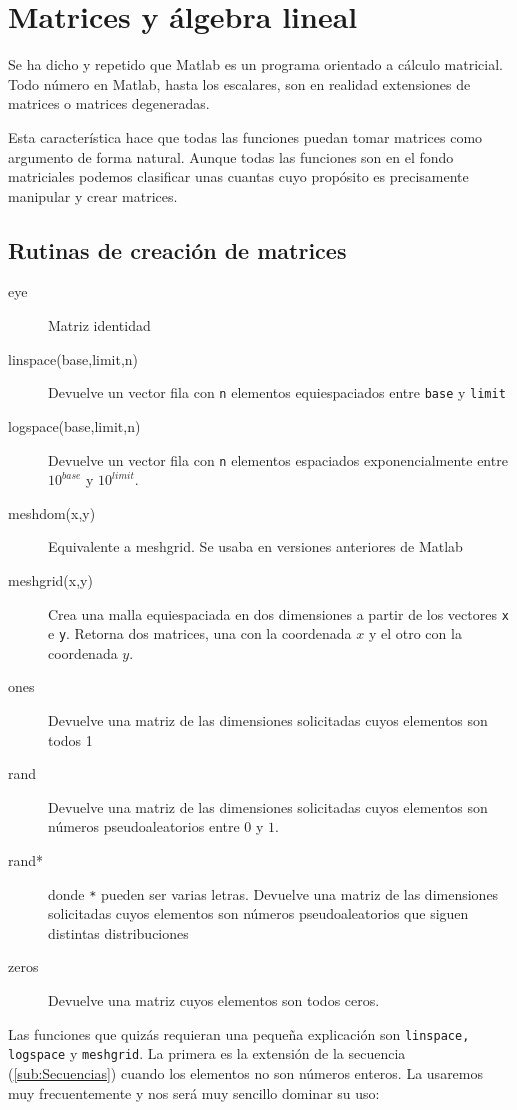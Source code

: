 
\chapter{Matrices y álgebra lineal}

Se ha dicho y repetido que Matlab es un programa orientado a cálculo
matricial. Todo número en Matlab, hasta los escalares, son en realidad
extensiones de matrices o matrices degeneradas.

Esta característica hace que todas las funciones puedan tomar matrices
como argumento de forma natural. Aunque todas las funciones son en el
fondo matriciales podemos clasificar unas cuantas cuyo propósito es
precisamente manipular y crear matrices.


\section{Rutinas de creación de matrices}

\begin{description}
\item [eye\texttt{}]Matriz identidad
\item [linspace(base,limit,n)]Devuelve un vector fila
  con \texttt{n} elementos equiespaciados entre \texttt{base} y
  \texttt{limit}
\item [logspace(base,limit,n)]Devuelve un vector fila
  con \texttt{n} elementos espaciados exponencialmente entre
  \texttt{$10^{base}$} y $10^{limit}$.
\item [meshdom(x,y)]Equivalente a meshgrid. Se usaba en
  versiones anteriores de Matlab
\item [meshgrid(x,y)]Crea una malla equiespaciada en
  dos dimensiones a partir de los vectores \texttt{x} e \texttt{y}.
  Retorna dos matrices, una con la coordenada $x$ y el otro con la
  coordenada $y$.
\item [ones]Devuelve una matriz de las dimensiones
  solicitadas cuyos elementos son todos 1
\item [rand\texttt{}]Devuelve una matriz de las
  dimensiones solicitadas cuyos elementos son números pseudoaleatorios
  entre $0$ y $1$.
\item [rand{*}]donde \texttt{{*}} pueden ser varias letras. Devuelve
  una matriz de las dimensiones solicitadas cuyos elementos son
  números pseudoaleatorios que siguen distintas distribuciones
\item [zeros\texttt{}]Devuelve una matriz cuyos elementos
  son todos ceros.
\end{description}
Las funciones que quizás requieran una pequeña explicación son
\texttt{linspace, logspace} y \texttt{meshgrid}. La primera es la
extensión de la secuencia (\ref{sub:Secuencias}) cuando los elementos
no son números enteros.  La usaremos muy frecuentemente y nos será muy
sencillo dominar su uso:

